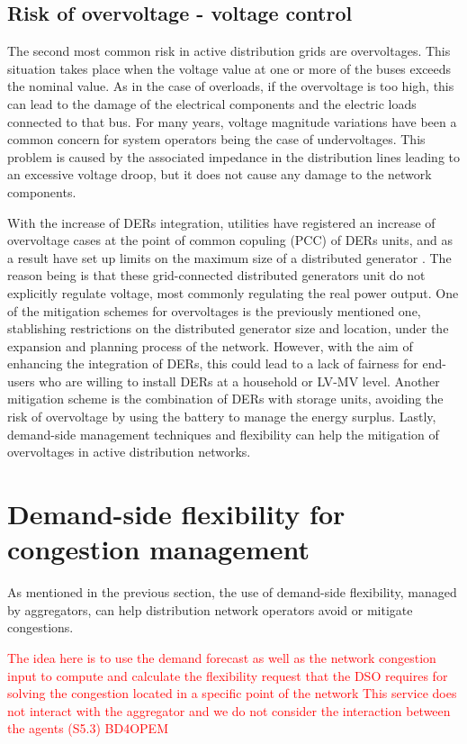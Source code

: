 \subsection{Risk of overvoltage - voltage control}
The second most common risk in active distribution grids are overvoltages. This situation takes place when the voltage value at one or more of the buses exceeds the nominal value. As in the case of overloads, if the overvoltage is too high, this can lead to the damage of the electrical components and the electric loads connected to that bus. 
For many years, voltage magnitude variations have been a common concern for system operators being the case of undervoltages. This problem is caused by the associated impedance in the distribution lines leading to an excessive voltage droop, but it does not cause any damage to the network components.  

With the increase of DERs integration, utilities have registered an increase of overvoltage cases at the point of common copuling (PCC) of DERs units, and as a result have set up limits on the maximum size of a distributed generator \cite{Kennedy2014}. The reason being is that these grid-connected distributed generators unit do not explicitly regulate voltage, most commonly regulating the real power output. One of the mitigation schemes for overvoltages is the previously mentioned one, stablishing restrictions on the distributed generator size and location, under the expansion and planning process of the network. However, with the aim of enhancing the integration of DERs, this could lead to a lack of fairness for end-users who are willing to install DERs at a household or LV-MV level. Another mitigation scheme is the combination of DERs with storage units, avoiding the risk of overvoltage by using the battery to manage the energy surplus. Lastly, demand-side management techniques and flexibility can help the mitigation of overvoltages in active distribution networks. 

\section{Demand-side flexibility for congestion management}
As mentioned in the previous section, the use of demand-side flexibility, managed by aggregators, can help distribution network operators avoid or mitigate congestions. 


\textcolor{red}{The idea here is to use the demand forecast as well as the network congestion input to compute and calculate the flexibility request that the DSO requires for solving the congestion located in a specific point of the network}
\textcolor{red}{This service does not interact with the aggregator and we do not consider the interaction between the agents (S5.3) BD4OPEM}

